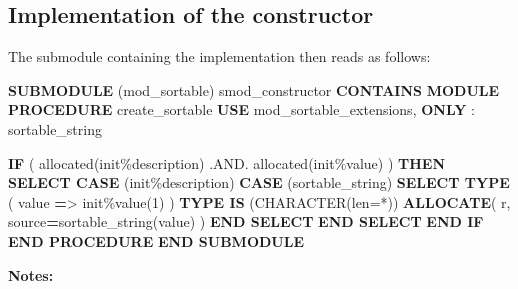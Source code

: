 \documentclass[]{scrartcl}
\newenvironment{Shaded}{}{}
\newcommand{\DataTypeTok}[1]{\textcolor[rgb]{0.56,0.13,0.00}{#1}}
\newcommand{\DecValTok}[1]{\textcolor[rgb]{0.25,0.63,0.44}{#1}}
\newcommand{\FunctionTok}[1]{\textcolor[rgb]{0.02,0.16,0.49}{#1}}
\newcommand{\KeywordTok}[1]{\textcolor[rgb]{0.00,0.44,0.13}{\textbf{#1}}}
\newcommand{\NormalTok}[1]{#1}
\newcommand{\OperatorTok}[1]{\textcolor[rgb]{0.40,0.40,0.40}{#1}}
\newcommand{\StringTok}[1]{\textcolor[rgb]{0.25,0.44,0.63}{#1}}
\begin{document}
\subsection{Implementation of the
constructor}\label{implementation-of-the-constructor}

The submodule containing the implementation then reads as follows:

\begin{Shaded}
\begin{Highlighting}[]
\KeywordTok{SUBMODULE}\NormalTok{ (mod\_sortable) smod\_constructor}
\KeywordTok{CONTAINS}
   \KeywordTok{MODULE PROCEDURE}\NormalTok{ create\_sortable}
      \KeywordTok{USE}\NormalTok{ mod\_sortable\_extensions, }\KeywordTok{ONLY}\NormalTok{ : sortable\_string}

      \KeywordTok{IF}\NormalTok{ ( }\FunctionTok{allocated}\NormalTok{(init}\OperatorTok{\%}\NormalTok{description) }\OperatorTok{.AND.} \FunctionTok{allocated}\NormalTok{(init}\OperatorTok{\%}\DataTypeTok{value}\NormalTok{) ) }\KeywordTok{THEN}
         \KeywordTok{SELECT CASE}\NormalTok{ (init}\OperatorTok{\%}\NormalTok{description)}
         \KeywordTok{CASE}\NormalTok{ (}\StringTok{\textquotesingle{}sortable\_string\textquotesingle{}}\NormalTok{)}
            \KeywordTok{SELECT TYPE}\NormalTok{ ( }\DataTypeTok{value} \KeywordTok{=}\OperatorTok{\textgreater{}}\NormalTok{ init}\OperatorTok{\%}\DataTypeTok{value}\NormalTok{(}\DecValTok{1}\NormalTok{) )}
            \KeywordTok{TYPE IS}\NormalTok{ (}\DataTypeTok{CHARACTER(len=*)}\NormalTok{)}
               \KeywordTok{ALLOCATE}\NormalTok{( r, source}\KeywordTok{=}\NormalTok{sortable\_string(}\DataTypeTok{value}\NormalTok{) )}
            \KeywordTok{END SELECT}
         \KeywordTok{END SELECT}
      \KeywordTok{END IF}
   \KeywordTok{END PROCEDURE}
\KeywordTok{END SUBMODULE}
\end{Highlighting}
\end{Shaded}

\textbf{Notes:}
\end{document}
